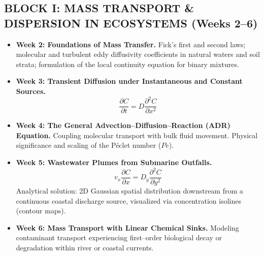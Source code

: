 \subsection{BLOCK I: MASS TRANSPORT \& DISPERSION IN ECOSYSTEMS (Weeks 2–6)}
\begin{itemize}
    \item \textbf{Week 2: Foundations of Mass Transfer.} Fick's first and second laws; molecular and turbulent eddy diffusivity coefficients in natural waters and soil strata; formulation of the local continuity equation for binary mixtures.
    \item \textbf{Week 3: Transient Diffusion under Instantaneous and Constant Sources.}
    \begin{equation*}
        \frac{\partial C}{\partial t} = D \frac{\partial^2 C}{\partial x^2}
    \end{equation*}
    \item \textbf{Week 4: The General Advection--Diffusion--Reaction (ADR) Equation.} Coupling molecular transport with bulk fluid movement. Physical significance and scaling of the P\'eclet number ($Pe$).
    \item \textbf{Week 5: Wastewater Plumes from Submarine Outfalls.}
    \begin{equation*}
        v_x \frac{\partial C}{\partial x} = D_y \frac{\partial^2 C}{\partial y^2}
    \end{equation*}
    Analytical solution: 2D Gaussian spatial distribution downstream from a continuous coastal discharge source, visualized via concentration isolines (contour maps).
    \item \textbf{Week 6: Mass Transport with Linear Chemical Sinks.} Modeling contaminant transport experiencing first--order biological decay or degradation within river or coastal currents.
\end{itemize}

